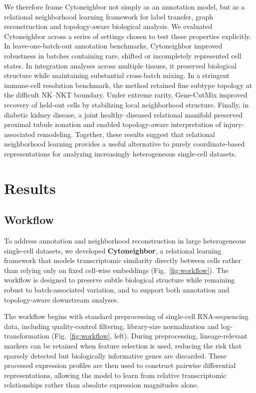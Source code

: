 \documentclass[11pt]{article}
\begin{document}
We therefore frame Cytoneighbor not simply as an annotation model, but as a relational neighborhood learning framework for label transfer, graph reconstruction and topology-aware biological analysis. We evaluated Cytoneighbor across a series of settings chosen to test these properties explicitly. In leave-one-batch-out annotation benchmarks, Cytoneighbor improved robustness in batches containing rare, shifted or incompletely represented cell states. In integration analyses across multiple tissues, it preserved biological structure while maintaining substantial cross-batch mixing. In a stringent immune-cell resolution benchmark, the method retained fine subtype topology at the difficult NK--NKT boundary. Under extreme rarity, Gene-CutMix improved recovery of held-out cells by stabilizing local neighborhood structure. Finally, in diabetic kidney disease, a joint healthy--diseased relational manifold preserved proximal tubule zonation and enabled topology-aware interpretation of injury-associated remodeling. Together, these results suggest that relational neighborhood learning provides a useful alternative to purely coordinate-based representations for analyzing increasingly heterogeneous single-cell datasets.


\section{Results}

\subsection{Workflow}

To address annotation and neighborhood reconstruction in large heterogeneous single-cell datasets, we developed \textbf{Cytoneighbor}, a relational learning framework that models transcriptomic similarity directly between cells rather than relying only on fixed cell-wise embeddings (Fig.~\ref{fig:workflow}). The workflow is designed to preserve subtle biological structure while remaining robust to batch-associated variation, and to support both annotation and topology-aware downstream analyses.

The workflow begins with standard preprocessing of single-cell RNA-sequencing data, including quality-control filtering, library-size normalization and log-transformation (Fig.~\ref{fig:workflow}, left). During preprocessing, lineage-relevant markers can be retained when feature selection is used, reducing the risk that sparsely detected but biologically informative genes are discarded. These processed expression profiles are then used to construct pairwise differential representations, allowing the model to learn from relative transcriptomic relationships rather than absolute expression magnitudes alone.
\end{document}
